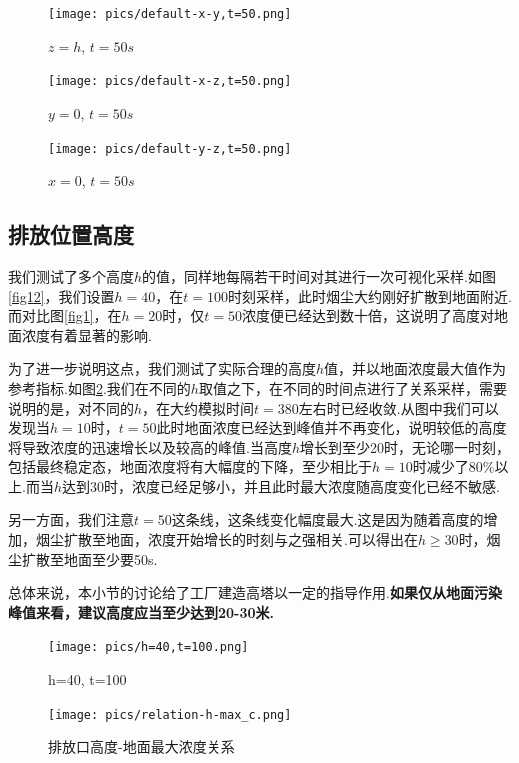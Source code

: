 \documentclass{article}
\begin{document}
	\begin{figure}[htbp]
		\begin{minipage}{0.49\textwidth}
			\texttt{[image: pics/default-x-y,t=50.png]}
			\caption{$z=h$, $t=50s$}
			\label{fig9}
		\end{minipage}
		\begin{minipage}{0.49\textwidth}
			\texttt{[image: pics/default-x-z,t=50.png]}
			\caption{$y=0$, $t=50s$}
			\label{fig10}
		\end{minipage}
		\centering
		\texttt{[image: pics/default-y-z,t=50.png]}
		\caption{$x=0$, $t=50s$}
		\label{fig11}
	\end{figure}

	\subsection{排放位置高度}
	我们测试了多个高度$h$的值，同样地每隔若干时间对其进行一次可视化采样.如图\ref{fig12}，我们设置$h=40$，在$t=100$时刻采样，此时烟尘大约刚好扩散到地面附近.而对比图\ref{fig1}，在$h=20$时，仅$t=50$浓度便已经达到数十倍，这说明了高度对地面浓度有着显著的影响.
	\par 为了进一步说明这点，我们测试了实际合理的高度$h$值，并以地面浓度最大值作为参考指标.如图\ref{fig13}.我们在不同的$h$取值之下，在不同的时间点进行了关系采样，需要说明的是，对不同的$h$，在大约模拟时间$t=380$左右时已经收敛.从图中我们可以发现当$h=10$时，$t=50$此时地面浓度已经达到峰值并不再变化，说明较低的高度将导致浓度的迅速增长以及较高的峰值.当高度$h$增长到至少20时，无论哪一时刻，包括最终稳定态，地面浓度将有大幅度的下降，至少相比于$h=10$时减少了80\%以上.而当$h$达到30时，浓度已经足够小，并且此时最大浓度随高度变化已经不敏感.
	\par 另一方面，我们注意$t=50$这条线，这条线变化幅度最大.这是因为随着高度的增加，烟尘扩散至地面，浓度开始增长的时刻与之强相关.可以得出在$h\geq30$时，烟尘扩散至地面至少要50s.
	\par 总体来说，本小节的讨论给了工厂建造高塔以一定的指导作用.\textbf{如果仅从地面污染峰值来看，建议高度应当至少达到20-30米.}
	
	\begin{figure}[htbp]
		\centering
		\texttt{[image: pics/h=40,t=100.png]}
		\caption{h=40, t=100}
		\label{fig12}
		\texttt{[image: pics/relation-h-max\_c.png]}
		\caption{排放口高度-地面最大浓度关系}
		\label{fig13}
	\end{figure}
\end{document}
